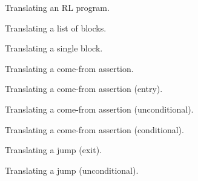 \begin{figure}[H]
  
  \caption{Translating an RL program.}\label{fig:rltrlProg}
\end{figure}

\begin{figure}[H]
  
  \caption{Translating a list of blocks.}\label{fig:rltrlBlks}
\end{figure}

\begin{figure}[H]
  
  \caption{Translating a single block.}\label{fig:rltrlBlk}
\end{figure}

\begin{figure}[H]
  
  \caption{Translating a come-from assertion.}\label{fig:rltrlFromEntry}
\end{figure}

\begin{figure}[H]
  
  \caption{Translating a come-from assertion (entry).}\label{fig:rltrlFromEntry}
\end{figure}

\begin{figure}[H]
  
  \caption{Translating a come-from assertion (unconditional).}\label{fig:rltrlFromFrom}
\end{figure}

\begin{figure}[H]
  
  \caption{Translating a come-from assertion (conditional).}\label{fig:rltrlFromFi}
\end{figure}

\begin{figure}[H]
  
  \caption{Translating a jump (exit).}\label{fig:rltrlJumpExit}
\end{figure}

\begin{figure}[H]
  
  \caption{Translating a jump (unconditional).}\label{fig:rltrlJumpGoto}
\end{figure}

